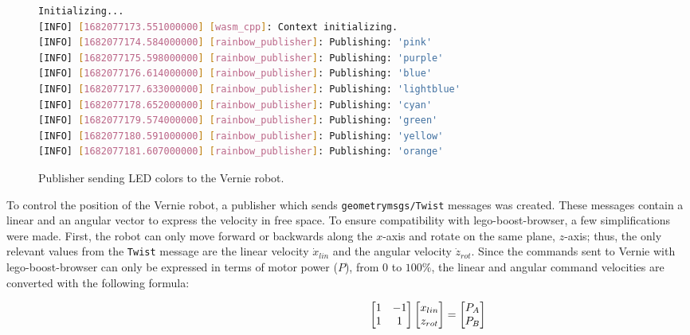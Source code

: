 \begin{figure}[htbp]
            \begin{lstlisting}[language=Bash]
Initializing...
[INFO] [1682077173.551000000] [wasm_cpp]: Context initializing.
[INFO] [1682077174.584000000] [rainbow_publisher]: Publishing: 'pink'
[INFO] [1682077175.598000000] [rainbow_publisher]: Publishing: 'purple'
[INFO] [1682077176.614000000] [rainbow_publisher]: Publishing: 'blue'
[INFO] [1682077177.633000000] [rainbow_publisher]: Publishing: 'lightblue'
[INFO] [1682077178.652000000] [rainbow_publisher]: Publishing: 'cyan'
[INFO] [1682077179.574000000] [rainbow_publisher]: Publishing: 'green'
[INFO] [1682077180.591000000] [rainbow_publisher]: Publishing: 'yellow'
[INFO] [1682077181.607000000] [rainbow_publisher]: Publishing: 'orange'
\end{lstlisting}
            \caption{Publisher sending \ac{LED} colors to the Vernie robot.}
            \label{fig:rainbow}
        \end{figure}


        To control the position of the Vernie robot, a publisher which sends \texttt{geometry\smallunderscore msgs/Twist} messages was created. These messages contain a linear and an angular vector to express the velocity in free space. To ensure compatibility with \textsf{lego-boost-browser}, a few simplifications were made. First, the robot can only move forward or backwards along the $x$-axis and rotate on the same plane, $z$-axis; thus, the only relevant values from the \texttt{Twist} message are the linear velocity $\dot{x}_{lin}$ and the angular velocity $\dot{z}_{rot}$. Since the commands sent to Vernie with \textsf{lego-boost-browser} can only be expressed in terms of motor power ($P$), from 0 to $100\%$, the linear and angular command velocities are converted with the following formula:
        
        \begin{equation}
            \hskip 5cm
            \begin{bmatrix}
                1 & -1 \\
                1 & 1
            \end{bmatrix}
            \begin{bmatrix}
                x_{lin} \\
                z_{rot}
            \end{bmatrix}
            =
            \begin{bmatrix}
                P_A \\
                P_B
            \end{bmatrix}
        \end{equation}


